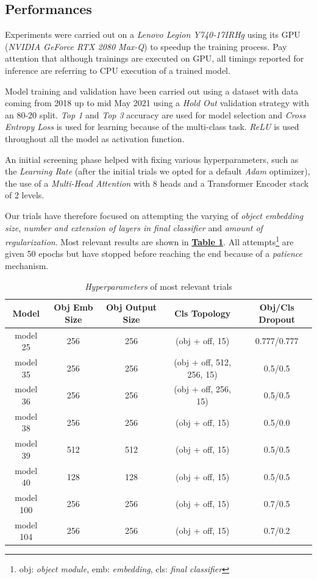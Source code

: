 \documentclass[12pt]{article}
\begin{document}
\subsection{Performances}\label{sec:1-lvl-perf}
Experiments were carried out on a \textit{Lenovo Legion Y740-17IRHg} using its GPU (\textit{NVIDIA GeForce RTX 2080 Max-Q}) to speedup the training process. Pay attention that although trainings are executed on GPU, all timings reported for inference are referring to CPU execution of a trained model. 

Model training and validation have been carried out using a dataset with data coming from 2018 up to mid May 2021 using a \textit{Hold Out} validation strategy with an 80-20 split. \textit{Top 1} and \textit{Top 3} accuracy are used for model selection and \textit{Cross Entropy Loss} is used for learning because of the multi-class task. \textit{ReLU} is used throughout all the model as activation function.

An initial screening phase helped with fixing various hyperparameters, such as the \textit{Learning Rate} (after the initial trials we opted for a default \textit{Adam} optimizer), the use of a \textit{Multi-Head Attention} with 8 heads and a Transformer Encoder stack of 2 levels.

Our trials have therefore focused on attempting the varying of \textit{object embedding size}, \textit{number and extension of layers in final classifier} and \textit{amount of regularization}. Most relevant results are shown in \hyperref[tb:firstlevel-hyper]{\textbf{Table \ref{tb:firstlevel-hyper}}}. All attempts\footnote{obj: \textit{object module}, emb: \textit{embedding}, cls: \textit{final classifier}} are given 50 epochs but have stopped before reaching the end because of a \textit{patience} mechanism.

\begin{table}[ht!]
	    \centering
	    \scriptsize
	    \begin{tabular}{ |c|c|c|c|c| }
        \hline
        \textbf{Model} & \textbf{Obj Emb Size} & \textbf{Obj Output Size} & \textbf{Cls Topology} & \textbf{Obj/Cls Dropout} \\
        \hline
        model 25 & 256 & 256 & (obj + off, 15) & 0.777/0.777 \\
        model 35 & 256 & 256 & (obj + off, 512, 256, 15) & 0.5/0.5 \\
        model 36 & 256 & 256 & (obj + off, 256, 15) & 0.5/0.5 \\
        model 38 & 256 & 256 & (obj + off, 15) & 0.5/0.0 \\
        model 39 & 512 & 512 & (obj + off, 15) & 0.5/0.5 \\
        model 40 & 128 & 128 & (obj + off, 15) & 0.5/0.5 \\
        model 100 & 256 & 256 & (obj + off, 15) & 0.7/0.5\\
        model 104 & 256 & 256 & (obj + off, 15) & 0.7/0.2\\
        \hline
        \end{tabular}
        \captionsetup{justification   = centering}
	    \caption{\textit{Hyperparameters} of most relevant trials}
	    \label{tb:firstlevel-hyper}
\end{table}
\end{document}
